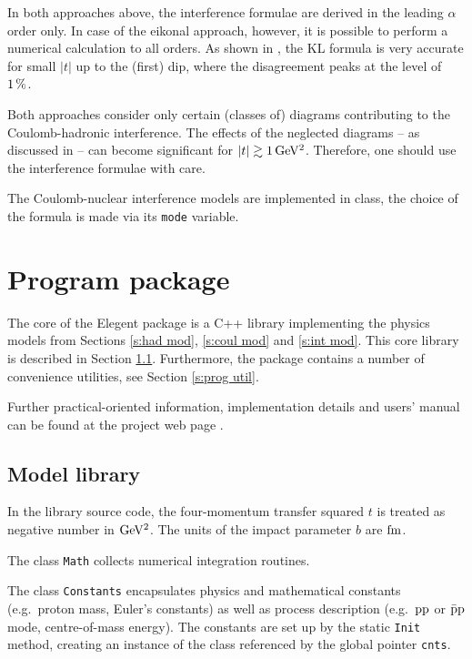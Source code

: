 \documentclass[preprint,12pt]{elsarticle}
\def\un#1{{\,\rm #1}}
\begin{document}
In both approaches above, the interference formulae are derived in the leading $\alpha$ order only. In case of the eikonal approach, however, it is possible to perform a numerical calculation to all orders. As shown in \cite[section 1.3.7]{jan_thesis}, the KL formula is very accurate for small $|t|$ up to the (first) dip, where the disagreement peaks at the level of $1\un{\%}$.

Both approaches consider only certain (classes of) diagrams contributing to the Coulomb-hadronic interference. The effects of the neglected diagrams -- as discussed in \cite[section 1.3.6]{jan_thesis} -- can become significant for $|t|\gtrsim 1\un{GeV^2}$. Therefore, one should use the interference formulae with care.

The Coulomb-nuclear interference models are implemented in class, the choice of the formula is made via its {\tt mode} variable.


\section{Program package}\label{s:prog}

The core of the Elegent package is a C++ library implementing the physics models from Sections \ref{s:had mod}, \ref{s:coul mod} and \ref{s:int mod}. This core library is described in Section \ref{s:prog lib}. Furthermore, the package contains a number of convenience utilities, see Section \ref{s:prog util}.

Further practical-oriented information, implementation details and users' manual can be found at the project web page \cite{elegent}.

\subsection{Model library}\label{s:prog lib}

In the library source code, the four-momentum transfer squared $t$ is treated as negative number in $\rm GeV^2$. The units of the impact parameter $b$ are $\rm fm$.

The class {\tt Math} collects numerical integration routines.

The class {\tt Constants} encapsulates physics and mathematical constants (e.g.~proton mass, Euler's constants) as well as process description (e.g.~$\rm pp$ or $\rm \bar pp$ mode, centre-of-mass energy). The constants are set up by the static {\tt Init} method, creating an instance of the class referenced by the global pointer {\tt cnts}.
\end{document}
